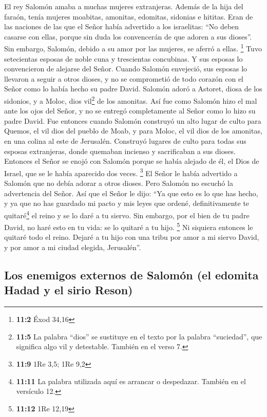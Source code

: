  El rey Salomón amaba a muchas mujeres extranjeras. Además
de la hija del faraón, tenía mujeres moabitas, amonitas, edomitas,
sidonias e hititas.  Eran de las naciones de las que el
Señor había advertido a los israelitas: ``No deben casarse con ellas,
porque sin duda los convencerán de que adoren a sus dioses''. Sin
embargo, Salomón, debido a su amor por las mujeres, se aferró a ellas.
\footnote{\textbf{11:2} Éxod 34,16}  Tuvo setecientas
esposas de noble cuna y trescientas concubinas. Y sus esposas lo
convencieron de alejarse del Señor.  Cuando Salomón
envejeció, sus esposas lo llevaron a seguir a otros dioses, y no se
comprometió de todo corazón con el Señor como lo había hecho su padre
David.  Salomón adoró a Astoret, diosa de los sidonios, y
a Moloc, dios vil\footnote{\textbf{11:5} La palabra ``dios'' se
  sustituye en el texto por la palabra ``suciedad'', que significa algo
  vil y detestable. También en el verso 7.} de los amonitas.
 Así fue como Salomón hizo el mal ante los ojos del Señor,
y no se entregó completamente al Señor como lo hizo su padre David.
 Fue entonces cuando Salomón construyó un alto lugar de
culto para Quemos, el vil dios del pueblo de Moab, y para Moloc, el vil
dios de los amonitas, en una colina al este de Jerusalén. 
Construyó lugares de culto para todas sus esposas extranjeras, donde
quemaban incienso y sacrificaban a sus dioses.  Entonces
el Señor se enojó con Salomón porque se había alejado de él, el Dios de
Israel, que se le había aparecido dos veces. \footnote{\textbf{11:9} 1Re
  3,5; 1Re 9,2}  El Señor le había advertido a Salomón
que no debía adorar a otros dioses. Pero Salomón no escuchó la
advertencia del Señor.  Así que el Señor le dijo: ``Ya
que esto es lo que has hecho, y ya que no has guardado mi pacto y mis
leyes que ordené, definitivamente te quitaré\footnote{\textbf{11:11} La
  palabra utilizada aquí es arrancar o despedazar. También en el
  versículo 12.} el reino y se lo daré a tu siervo.  Sin
embargo, por el bien de tu padre David, no haré esto en tu vida: se lo
quitaré a tu hijo. \footnote{\textbf{11:12} 1Re 12,19} 
Ni siquiera entonces le quitaré todo el reino. Dejaré a tu hijo con una
tribu por amor a mi siervo David, y por amor a mi ciudad elegida,
Jerusalén''.

\hypertarget{los-enemigos-externos-de-salomuxf3n-el-edomita-hadad-y-el-sirio-reson}{%
\subsection{Los enemigos externos de Salomón (el edomita Hadad y el
sirio
Reson)}\label{los-enemigos-externos-de-salomuxf3n-el-edomita-hadad-y-el-sirio-reson}}


